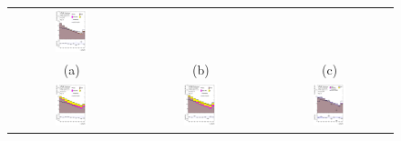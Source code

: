 \documentclass[PAPER, coverpage, atlasdraft=true, texlive=2016, UKenglish]{\ATLASLATEXPATH atlasdoc} %
\providecommand{\DIFaddbeginFL}{} %
\providecommand{\DIFaddendFL}{} %
\providecommand{\DIFdelbeginFL}{} %
\providecommand{\DIFdelendFL}{} %
\begin{document}
\begin{figure}[H]
\begin{tabular}{@{}ccc@{}}
\DIFdelbeginFL %
\DIFdelendFL \DIFaddbeginFL \includegraphics[page=1,width=0.28\textwidth]{figures/new_pt/log_or_nolog/tuH_reg1l1tau1b2j_ss_log_.pdf}\DIFaddendFL \\
(a) & (b) & (c) \\
\DIFdelbeginFL %
\DIFdelendFL \DIFaddbeginFL \includegraphics[page=1,width=0.28\textwidth]{figures/new_pt/log_or_nolog/tuH_reg1l1tau1b2j_os_log_.pdf}\DIFaddendFL &
\DIFdelbeginFL %
\DIFdelendFL \DIFaddbeginFL \includegraphics[page=1,width=0.28\textwidth]{figures/new_pt/log_or_nolog/tuH_reg1l1tau1b3j_os_log_.pdf} &
\includegraphics[page=1,width=0.28\textwidth]{figures/new_pt/log_or_nolog/tuH_reg1l2tau1bnj_ss_log_.pdf} \DIFaddendFL \\

\end{tabular}
\end{figure}
\end{document}
